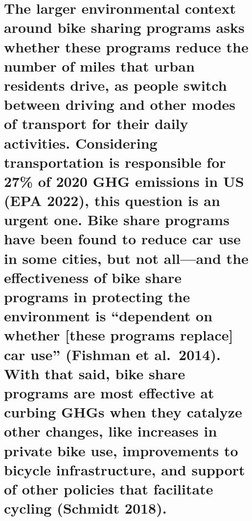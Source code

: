 \documentclass[
  12pt,
]{article}
\begin{document}
\hypertarget{the-larger-environmental-context-around-bike-sharing-programs-asks-whether-these-programs-reduce-the-number-of-miles-that-urban-residents-drive-as-people-switch-between-driving-and-other-modes-of-transport-for-their-daily-activities.-considering-transportation-is-responsible-for-27-of-2020-ghg-emissions-in-us-epa-2022-this-question-is-an-urgent-one.-bike-share-programs-have-been-found-to-reduce-car-use-in-some-cities-but-not-alland-the-effectiveness-of-bike-share-programs-in-protecting-the-environment-is-dependent-on-whether-these-programs-replace-car-use-fishman-et-al.-2014.-with-that-said-bike-share-programs-are-most-effective-at-curbing-ghgs-when-they-catalyze-other-changes-like-increases-in-private-bike-use-improvements-to-bicycle-infrastructure-and-support-of-other-policies-that-facilitate-cycling-schmidt-2018.}{%
\section{The larger environmental context around bike sharing programs
asks whether these programs reduce the number of miles that urban
residents drive, as people switch between driving and other modes of
transport for their daily activities. Considering transportation is
responsible for 27\% of 2020 GHG emissions in US (EPA 2022), this
question is an urgent one. Bike share programs have been found to reduce
car use in some cities, but not all---and the effectiveness of bike
share programs in protecting the environment is ``dependent on whether
{[}these programs replace{]} car use'' (Fishman et al.~2014). With that
said, bike share programs are most effective at curbing GHGs when they
catalyze other changes, like increases in private bike use, improvements
to bicycle infrastructure, and support of other policies that facilitate
cycling (Schmidt
2018).}\label{the-larger-environmental-context-around-bike-sharing-programs-asks-whether-these-programs-reduce-the-number-of-miles-that-urban-residents-drive-as-people-switch-between-driving-and-other-modes-of-transport-for-their-daily-activities.-considering-transportation-is-responsible-for-27-of-2020-ghg-emissions-in-us-epa-2022-this-question-is-an-urgent-one.-bike-share-programs-have-been-found-to-reduce-car-use-in-some-cities-but-not-alland-the-effectiveness-of-bike-share-programs-in-protecting-the-environment-is-dependent-on-whether-these-programs-replace-car-use-fishman-et-al.-2014.-with-that-said-bike-share-programs-are-most-effective-at-curbing-ghgs-when-they-catalyze-other-changes-like-increases-in-private-bike-use-improvements-to-bicycle-infrastructure-and-support-of-other-policies-that-facilitate-cycling-schmidt-2018.}}
\end{document}
